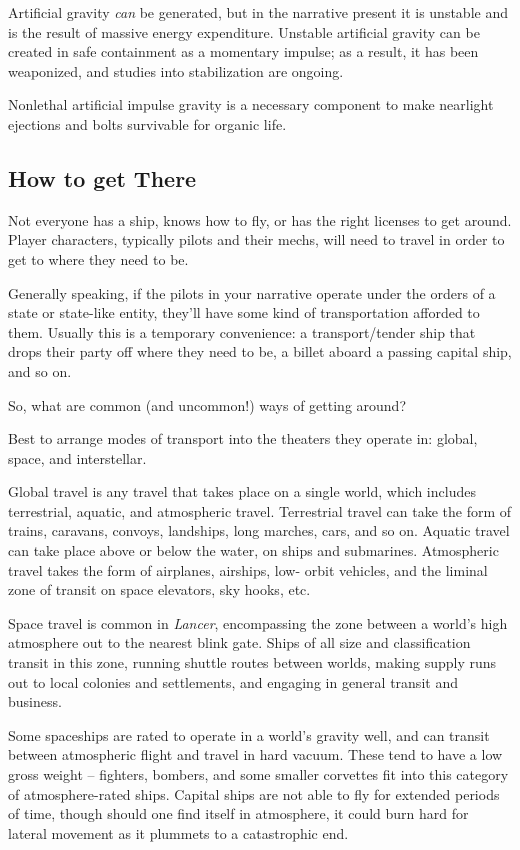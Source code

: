 Artificial gravity \textit{can} be generated, but in the narrative present it is unstable and is the result of
massive energy expenditure. Unstable artificial gravity can be created in safe containment as a
momentary impulse; as a result, it has been weaponized, and studies into stabilization are
ongoing.

Nonlethal artificial impulse gravity is a necessary component to make nearlight ejections and
bolts survivable for organic life.

\subsection{How to get There}

Not everyone has a ship, knows how to fly, or has the right licenses to get around. Player
characters, typically pilots and their mechs, will need to travel in order to get to where they need
to be.

Generally speaking, if the pilots in your narrative operate under the orders of a state or state-like
entity, they'll have some kind of transportation afforded to them. Usually this is a temporary
convenience: a transport/tender ship that drops their party off where they need to be, a billet
aboard a passing capital ship, and so on.

So, what are common (and uncommon!) ways of getting around?

Best to arrange modes of transport into the theaters they operate in: global, space, and
interstellar.

Global travel is any travel that takes place on a single world, which includes terrestrial, aquatic,
and atmospheric travel. Terrestrial travel can take the form of trains, caravans, convoys,
landships, long marches, cars, and so on. Aquatic travel can take place above or below the
water, on ships and submarines. Atmospheric travel takes the form of airplanes, airships, low-
orbit vehicles, and the liminal zone of transit on space elevators, sky hooks, etc.

Space travel is common in \textit{Lancer}, encompassing the zone between a world's high atmosphere
out to the nearest blink gate. Ships of all size and classification transit in this zone, running
shuttle routes between worlds, making supply runs out to local colonies and settlements, and
engaging in general transit and business.

Some spaceships are rated to operate in a world's gravity well, and can transit between
atmospheric flight and travel in hard vacuum. These tend to have a low gross weight --  fighters,
bombers, and some smaller corvettes fit into this category of atmosphere-rated ships. Capital
ships are not able to fly for extended periods of time, though should one find itself in
atmosphere, it could burn hard for lateral movement as it plummets to a catastrophic end.

